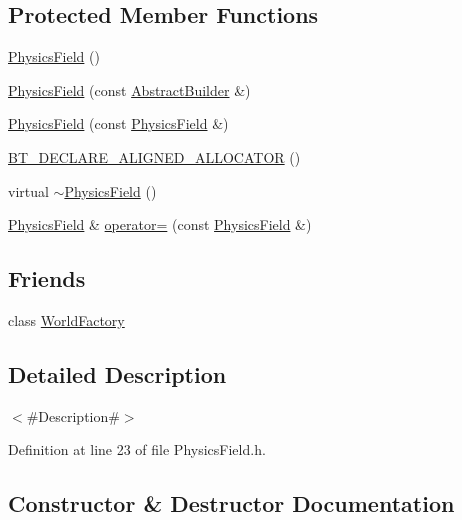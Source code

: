 \subsection*{Protected Member Functions}
\begin{DoxyCompactItemize}
\item 
\mbox{\hyperlink{classnjli_1_1_physics_field_a32d6673e4cb636cf54a03d50dc68fc68}{Physics\+Field}} ()
\item 
\mbox{\hyperlink{classnjli_1_1_physics_field_a44e9f7757b2ebcda987938a0abea31b3}{Physics\+Field}} (const \mbox{\hyperlink{classnjli_1_1_abstract_builder}{Abstract\+Builder}} \&)
\item 
\mbox{\hyperlink{classnjli_1_1_physics_field_a927f25e2cfa6e4dded2c44b4b15600a0}{Physics\+Field}} (const \mbox{\hyperlink{classnjli_1_1_physics_field}{Physics\+Field}} \&)
\item 
\mbox{\hyperlink{classnjli_1_1_physics_field_a8fe55cbe1f75e559d88ae147b2da3ff8}{B\+T\+\_\+\+D\+E\+C\+L\+A\+R\+E\+\_\+\+A\+L\+I\+G\+N\+E\+D\+\_\+\+A\+L\+L\+O\+C\+A\+T\+OR}} ()
\item 
virtual \mbox{\hyperlink{classnjli_1_1_physics_field_a17d25bf024e5ff48a22e315791ef0fd1}{$\sim$\+Physics\+Field}} ()
\item 
\mbox{\hyperlink{classnjli_1_1_physics_field}{Physics\+Field}} \& \mbox{\hyperlink{classnjli_1_1_physics_field_a45c6e394c3f7d50c2a09207c69c210c3}{operator=}} (const \mbox{\hyperlink{classnjli_1_1_physics_field}{Physics\+Field}} \&)
\end{DoxyCompactItemize}
\subsection*{Friends}
\begin{DoxyCompactItemize}
\item 
class \mbox{\hyperlink{classnjli_1_1_physics_field_acb96ebb09abe8f2a37a915a842babfac}{World\+Factory}}
\end{DoxyCompactItemize}


\subsection{Detailed Description}
$<$\#\+Description\#$>$ 

Definition at line 23 of file Physics\+Field.\+h.



\subsection{Constructor \& Destructor Documentation}
\mbox{\label{classnjli_1_1_physics_field_a32d6673e4cb636cf54a03d50dc68fc68}} 

